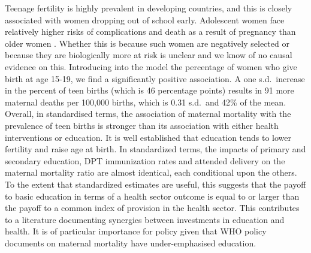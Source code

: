 \documentclass{article}[12pt,subeqn]
\begin{document}
\begin{spacing}{1.4}
Teenage fertility is highly prevalent in developing countries, and this is 
closely associated with women dropping out of school early. Adolescent women face 
relatively higher risks of complications and death as a result of pregnancy than 
older women \citep{Condeetal2005, Pattonetal2009}.  Whether this is because such 
women are negatively selected or because they are biologically more at risk is 
unclear and we know of no causal evidence on this. Introducing into the model the 
percentage of women who give birth at age 15-19, we find a significantly positive 
association. A one s.d.\ increase in the percent of teen births (which is 46 
percentage points) results in 91 more maternal deaths per 100,000 births, which is 
0.31 s.d.\ and 42\% of the mean. Overall, in standardised terms, the association 
of maternal mortality with the prevalence of teen births is stronger than its
association with either health interventions or education. It is well established
that education tends to lower fertility and raise age at birth.  In standardized
terms, the impacts of primary and secondary education, DPT 
immunization rates and attended delivery on the maternal mortality ratio are almost
identical, each conditional upon the others. To the extent that standardized 
estimates are useful, this suggests that the payoff to basic education in terms of 
a health sector outcome is equal to or larger than the payoff to a common index of 
provision in the health sector. This contributes to a literature documenting 
synergies between investments in education and health.  It is of particular
importance for policy given that WHO policy documents on maternal mortality have 
under-emphasised education.


\end{spacing}
\end{document}
